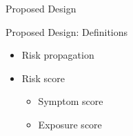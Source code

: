 \documentclass[12pt]{beamer}
\begin{document}
\begin{section}{Proposed Design}

\begin{frame}{Proposed Design: Definitions}
  \begin{itemize}
    \item Risk propagation
    \item Risk score
      \begin{itemize}
        \item Symptom score
        \item Exposure score
      \end{itemize}
  \end{itemize}
\end{frame}

\end{section}
\end{document}
